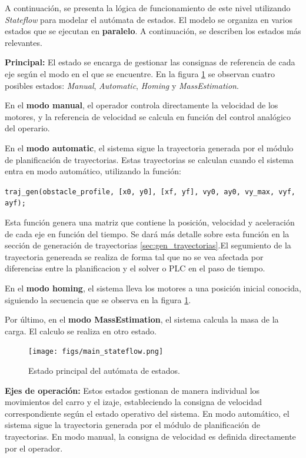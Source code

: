 \documentclass{article}
\begin{document}
        A continuación, se presenta la lógica de funcionamiento de este nivel utilizando \textit{Stateflow} para modelar el autómata de estados. El modelo se organiza en varios estados que se ejecutan en \textbf{paralelo}. A continuación, se describen los estados más relevantes.


        \textbf{Principal:} 
            El estado se encarga de gestionar las consignas de referencia de cada eje según el modo en el que se encuentre. En la figura \ref{fig:main_stateflow} se observan cuatro posibles estados: \textit{Manual}, \textit{Automatic}, \textit{Homing} y \textit{MassEstimation}. 

            En el \textbf{modo manual}, el operador controla directamente la velocidad de los motores, y la referencia de velocidad se calcula en función del control analógico del operario.

            En el \textbf{modo automatic}, el sistema sigue la trayectoria generada por el módulo de planificación de trayectorias. Estas trayectorias se calculan cuando el sistema entra en modo automático, utilizando la función:
            \begin{center}
            \texttt{traj\_gen(obstacle\_profile, [x0, y0], [xf, yf], vy0, ay0, vy\_max, vyf, ayf);}
            \end{center}
            Esta función genera una matriz que contiene la posición, velocidad y aceleración de cada eje en función del tiempo. Se dará más detalle sobre esta función en la sección de generación de trayectorias \ref{sec:gen_trayectorias}.El segumiento de la trayectoria genereada se realiza de forma tal que no se vea afectada por diferencias entre la planificacion y el solver o PLC en el paso de tiempo. 

            En el \textbf{modo homing}, el sistema lleva los motores a una posición inicial conocida, siguiendo la secuencia que se observa en la figura \ref{fig:main_stateflow}.

            Por último, en el \textbf{modo MassEstimation}, el sistema calcula la masa de la carga. El calculo se realiza en otro estado.

        
            \begin{figure} [H]
                \centering
                \texttt{[image: figs/main\_stateflow.png]}
                \caption{Estado principal del autómata de estados.}
                \label{fig:main_stateflow}
            \end{figure}

        \textbf{Ejes de operación:}
            Estos estados gestionan de manera individual los movimientos del carro y el izaje, estableciendo la consigna de velocidad correspondiente según el estado operativo del sistema. En modo automático, el sistema sigue la trayectoria generada por el módulo de planificación de trayectorias. En modo manual, la consigna de velocidad es definida directamente por el operador.
\end{document}
